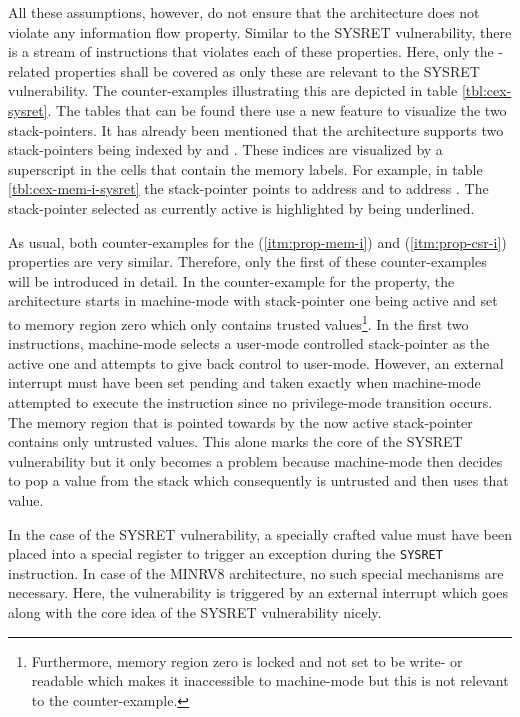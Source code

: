 All these assumptions, however, do not ensure that the architecture does not violate any information flow property.
Similar to the SYSRET vulnerability, there is a stream of instructions that violates each of these properties.
Here, only the -related properties shall be covered as only these are relevant to the SYSRET vulnerability.
The counter-examples illustrating this are depicted in table \ref{tbl:cex-sysret}.
The tables that can be found there use a new feature to visualize the two stack-pointers.
It has already been mentioned that the architecture supports two stack-pointers being indexed by  and .
These indices are visualized by a superscript in the cells that contain the memory labels.
For example, in table \ref{tbl:cex-mem-i-sysret} the stack-pointer  points to address  and  to address .
The stack-pointer selected as currently active is highlighted by being underlined.

As usual, both counter-examples for the  (\ref{itm:prop-mem-i}) and  (\ref{itm:prop-csr-i}) properties are very similar.
Therefore, only the first of these counter-examples will be introduced in detail.
In the counter-example for the  property, the architecture starts in machine-mode with stack-pointer one being active and set to memory region zero which only contains trusted values\footnote{%
    Furthermore, memory region zero is locked and not set to be write- or readable which makes it inaccessible to machine-mode but this is not relevant to the counter-example.
}.
In the first two instructions, machine-mode selects a user-mode controlled stack-pointer as the active one and attempts to give back control to user-mode.
However, an external interrupt must have been set pending and taken exactly when machine-mode attempted to execute the  instruction since no privilege-mode transition occurs.
The memory region that is pointed towards by the now active stack-pointer contains only untrusted values.
This alone marks the core of the SYSRET vulnerability but it only becomes a problem because machine-mode then decides to pop a value from the stack which consequently is untrusted and then uses that value.

In the case of the SYSRET vulnerability, a specially crafted value must have been placed into a special register to trigger an exception during the \lstinline{SYSRET} instruction.
In case of the MINRV8 architecture, no such special mechanisms are necessary.
Here, the vulnerability is triggered by an external interrupt which goes along with the core idea of the SYSRET vulnerability nicely.

